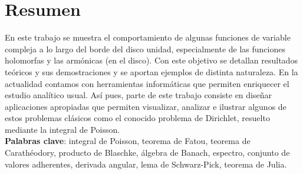 %
%
%
%
%

\chapter{Resumen}


En este trabajo se muestra el comportamiento de algunas funciones de variable compleja a lo largo del borde del disco unidad, especialmente de las funciones holomorfas y las armónicas (en el disco). Con este objetivo se detallan resultados teóricos y sus demostraciones y se aportan ejemplos de distinta naturaleza. En la actualidad contamos con herramientas informáticas que permiten enriquecer el estudio analítico usual. Así pues, parte de este trabajo consiste en diseñar aplicaciones apropiadas que permiten visualizar, analizar e ilustrar algunos de estos problemas clásicos como el conocido problema de Dirichlet, resuelto mediante la integral de Poisson. \\

\textbf{Palabras clave}: integral de Poisson, teorema de Fatou, teorema de Carathéodory, producto de Blaschke, álgebra de Banach, espectro, conjunto de valores adherentes, derivada angular, lema de Schwarz-Pick, teorema de Julia. \\

\endinput
